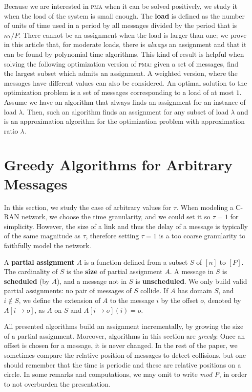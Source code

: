 \documentclass[a4paper,UKenglish,cleveref, autoref, thm-restate]{lipics-v2019}
\newcommand\pma{\textsc{pma}\xspace}
\begin{document}
Because we are interested in \pma when it can be solved positively, we study it when the load of the system is small enough. The \textbf{load} is defined as the number of units of time used in a period by all messages divided by the period that is $n\tau /P$. There cannot be an assignment when the load is larger than one; we prove in this article that, for moderate loads, there is \emph{always} an assignment and that it can be found by polynomial time algorithms. This kind of result is helpful when solving the following optimization version of \pma: given a set of messages, find the largest subset 
which admits an assignment. A weighted version, where the messages have different values can also be considered. An optimal solution to the optimization problem is a set of messages corresponding to a load of at most $1$. Assume we have an algorithm that always finds an assignment for an instance of load $\lambda$. Then, such an algorithm finds an assignment for any subset of load $\lambda$ and is an approximation algorithm for the optimization problem with approximation ratio $\lambda$.


\section{Greedy Algorithms for Arbitrary Messages} \label{sec:large}

In this section, we study the case of arbitrary values for $\tau$. When modeling a C-RAN network, we choose the time granularity, and we could set it so $\tau = 1$ for simplicity. However, the size of a link and thus the delay of a message is typically of the same magnitude as $\tau$, therefore setting $\tau = 1$ is a too coarse granularity to faithfully model the network.

A \textbf{partial assignment} $A$ is a function defined from a subset $S$ of $[n]$ to $[P]$.
The cardinality of $S$ is the \textbf{size} of partial assignment $A$. A message in $S$ is \textbf{scheduled} (by $A$), and a message not in $S$ is \textbf{unscheduled}. We only build valid partial assignments: no pair of messages of $S$ collide. If $A$ has domain $S$, and $i \notin S$, we define the extension of $A$ to the message $i$ by the offset $o$, denoted by $A[i \rightarrow o]$, as $A$ on $S$ and $A[i \rightarrow o](i) = o$.

All presented algorithms build an assignment incrementally, by growing the size of a partial assignment. Moreover, algorithms in this section are \emph{greedy}: Once an offset is chosen for a message, it is never changed. In the rest of the paper, we sometimes compare the relative position of messages to detect collisions, but one should remember that the time is periodic and these are relative positions on a circle. 
In some remarks and computations, we may omit to write \emph{mod P}, in order to not overburden the presentation.
\end{document}
